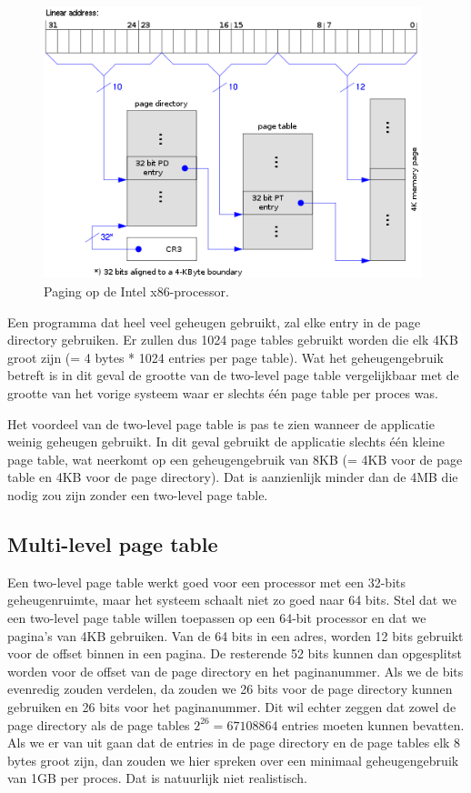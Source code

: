 \begin{figure}
\begin{center}
\includegraphics[width=110mm]{images/x86-paging.png}
\end{center}
\caption{Paging op de Intel x86-processor.}
\label{paging-x86}
\end{figure}

Een programma dat heel veel geheugen gebruikt, zal elke entry in de page directory gebruiken. Er zullen dus 1024 page tables gebruikt worden die elk 4KB groot zijn (= 4 bytes * 1024 entries per page table). Wat het geheugengebruik betreft is in dit geval de grootte van de two-level page table vergelijkbaar met de grootte van het vorige systeem waar er slechts \'e\'en page table per proces was.

Het voordeel van de two-level page table is pas te zien wanneer de applicatie weinig geheugen gebruikt. In dit geval gebruikt de applicatie slechts \'e\'en kleine page table, wat neerkomt op een geheugengebruik van 8KB (= 4KB voor de page table en 4KB voor de page directory). Dat is aanzienlijk minder dan de 4MB die nodig zou zijn zonder een two-level page table.

\subsection{Multi-level page table}\label{multi-level-page-table}

Een two-level page table werkt goed voor een processor met een 32-bits geheugenruimte, maar het systeem schaalt niet zo goed naar 64 bits. Stel dat we een two-level page table willen toepassen op een 64-bit processor en dat we pagina's van 4KB gebruiken. Van de 64 bits in een adres, worden 12 bits gebruikt voor de offset binnen in een pagina. De resterende 52 bits kunnen dan opgesplitst worden voor de offset van de page directory en het paginanummer. Als we de bits evenredig zouden verdelen, da zouden we 26 bits voor de page directory kunnen gebruiken en 26 bits voor het paginanummer. Dit wil echter zeggen dat zowel de page directory als de page tables $2^{26} = 67108864$ entries moeten kunnen bevatten. Als we er van uit gaan dat de entries in de page directory en de page tables elk 8 bytes groot zijn, dan zouden we hier spreken over een minimaal geheugengebruik van 1GB per proces. Dat is natuurlijk niet realistisch.

